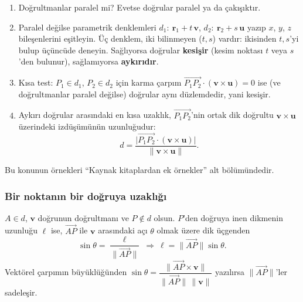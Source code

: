 \begin{teorem}
\begin{enumerate}
  \item Doğrultmanlar paralel mi? Evetse doğrular paralel ya da çakışıktır.
  \item Paralel değilse parametrik denklemleri $d_1:\ \mathbf r_1+t\,\mathbf v$, $d_2:\ \mathbf r_2+s\,\mathbf u$ yazıp $x$, $y$, $z$ bileşenlerini eşitleyin. Üç denklem, iki bilinmeyen ($t,s$) vardır: ikisinden $t,s$'yi bulup üçüncüde deneyin. Sağlıyorsa doğrular \textbf{kesişir} (kesim noktası $t$ veya $s$'den bulunur), sağlamıyorsa \textbf{aykırıdır}.
  \item Kısa test: $P_1\in d_1$, $P_2\in d_2$ için karma çarpım $\overrightarrow{P_1P_2}\cdot(\mathbf v\times\mathbf u)=0$ ise (ve doğrultmanlar paralel değilse) doğrular aynı düzlemdedir, yani kesişir.
  \item Aykırı doğrular arasındaki en kısa uzaklık, $\overrightarrow{P_1P_2}$'nin ortak dik doğrultu $\mathbf v\times\mathbf u$ üzerindeki izdüşümünün uzunluğudur:
  \[ d=\frac{\big|\overrightarrow{P_1P_2}\cdot(\mathbf v\times\mathbf u)\big|}{\|\mathbf v\times\mathbf u\|}. \]
\end{enumerate}
\end{teorem}
Bu konunun örnekleri ``Kaynak kitaplardan ek örnekler'' alt bölümündedir.

\subsubsection{Bir noktanın bir doğruya uzaklığı}

$A\in d$, $\mathbf v$ doğrunun doğrultmanı ve $P\notin d$ olsun. $P$'den doğruya inen dikmenin uzunluğu $\ell$ ise, $\overrightarrow{AP}$ ile $\mathbf v$ arasındaki açı $\theta$ olmak üzere dik üçgenden
\[ \sin\theta=\frac{\ell}{\|\overrightarrow{AP}\|}\ \Rightarrow\ \ell=\|\overrightarrow{AP}\|\sin\theta . \]
Vektörel çarpımın büyüklüğünden $\sin\theta=\dfrac{\|\overrightarrow{AP}\times\mathbf v\|}{\|\overrightarrow{AP}\|\,\|\mathbf v\|}$ yazılırsa $\|\overrightarrow{AP}\|$'ler sadeleşir.

\begin{center}
\end{center}

